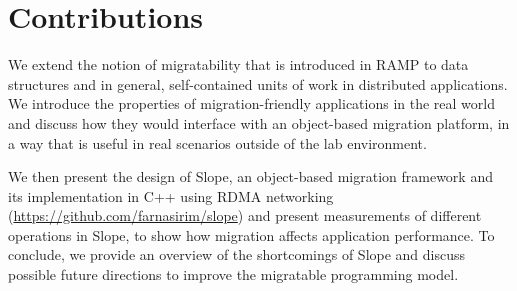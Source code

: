 \section{Contributions}
We extend the notion of migratability that is
introduced in RAMP \cite{memon2018ramp} to data structures and in general,
self-contained units of work in distributed applications.
We introduce
the properties of migration-friendly applications in the real world and discuss
how they would interface with an object-based migration platform, in a way
that is useful in real scenarios outside of the lab environment.

We then present the design of Slope, an object-based migration framework
and its implementation in C++ using RDMA networking (\hyperlink{https://github.com/farnasirim/slope}{https://github.com/farnasirim/slope}) and present measurements
of different operations in Slope, to show how migration affects application
performance.
To conclude, we provide an overview of the shortcomings of Slope and
discuss possible future directions to improve the migratable programming model.


